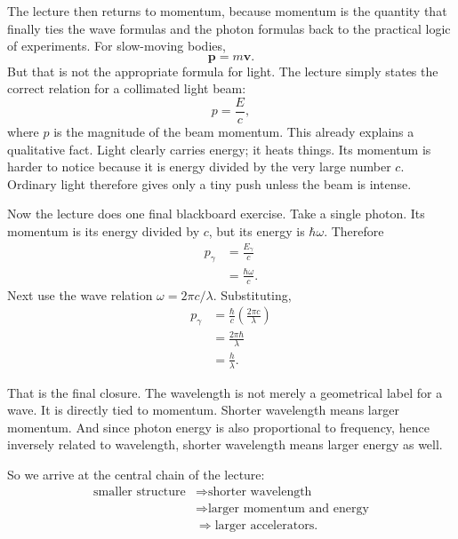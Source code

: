 The lecture then returns to momentum, because momentum is the quantity that finally ties the wave formulas and the photon formulas back to the practical logic of experiments. For slow-moving bodies,
\begin{equation}
\mathbf{p} = m\mathbf{v}.
\end{equation}
But that is not the appropriate formula for light. The lecture simply states the correct relation for a collimated light beam:
\begin{equation}
p = \frac{E}{c},
\end{equation}
where \(p\) is the magnitude of the beam momentum. This already explains a qualitative fact. Light clearly carries energy; it heats things. Its momentum is harder to notice because it is energy divided by the very large number \(c\). Ordinary light therefore gives only a tiny push unless the beam is intense.

Now the lecture does one final blackboard exercise. Take a single photon. Its momentum is its energy divided by \(c\), but its energy is \(\hbar\omega\). Therefore
\begin{align}
p_\gamma &= \frac{E_\gamma}{c} \nonumber\\
&= \frac{\hbar\omega}{c}. \label{eq:photon-momentum-first}
\end{align}
Next use the wave relation \(\omega = 2\pi c/\lambda\). Substituting,
\begin{align}
p_\gamma
&= \frac{\hbar}{c}\left(\frac{2\pi c}{\lambda}\right) \nonumber\\
&= \frac{2\pi\hbar}{\lambda} \nonumber\\
&= \frac{h}{\lambda}. \label{eq:debroglie-photon}
\end{align}

That is the final closure. The wavelength is not merely a geometrical label for a wave. It is directly tied to momentum. Shorter wavelength means larger momentum. And since photon energy is also proportional to frequency, hence inversely related to wavelength, shorter wavelength means larger energy as well.

So we arrive at the central chain of the lecture:
\begin{equation}
\begin{aligned}
\text{smaller structure}
&\Longrightarrow \text{shorter wavelength}\\
&\Longrightarrow \text{larger momentum and energy}\\
&\Longrightarrow \text{larger accelerators}.
\end{aligned}
\end{equation}

